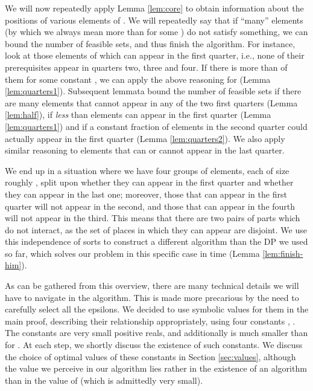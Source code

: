 \documentclass{article}
\theoremstyle{definition}
\begin{document}
We will now repeatedly apply Lemma \ref{lem:core} to obtain information about the
positions of various elements of . We will repeatedly say that if ``many'' elements
(by which we always mean more than  for some ) do not satisfy something,
we can bound the number of feasible sets, and thus finish the algorithm.
For instance, look at those elements of  which
can appear in the first quarter, i.e., none of their prerequisites appear in quarters
two, three and four. If there is more than  of them for some constant , we can apply the above
reasoning for  (Lemma \ref{lem:quarters1}).
Subsequent lemmata bound the number of feasible sets if there are many
elements that cannot appear in any of the two first quarters (Lemma \ref{lem:half}),
if {\em less} than  elements can appear in the first
quarter (Lemma \ref{lem:quarters1}) and if a constant fraction of elements
in the second quarter could actually appear in the first quarter
(Lemma \ref{lem:quarters2}). We also apply similar reasoning to elements that
can or cannot appear in the last quarter.

We end up in a situation where we have four groups of elements, each of size
roughly , split upon whether they can appear in the first quarter
and whether they can appear in the last one; moreover, those that can appear in
the first quarter will not appear in the second, and those that can appear in
the fourth will not appear in the third. This means that there are two pairs of parts
which do not interact, as the set of places in which they can appear are
disjoint. We use this independence of sorts to construct a different algorithm
than the DP we used so far, which solves our problem in this specific case
in time  (Lemma \ref{lem:finish-him}).

As can be gathered from this overview, there are many technical details we
will have to navigate in the algorithm. This is made more precarious by
the need to carefully select all the epsilons. We decided to use symbolic values for
them in the main proof, describing their relationship appropriately, using four constants
, . The constants  are very small positive reals, and additionally 
is much smaller than  for . At each step, we shortly discuss the existence
of such constants. We discuss the choice of optimal values of these constants in Section \ref{sec:values},
although the value we perceive in our algorithm lies rather in the existence
of an  algorithm than in the value of  (which is admittedly very small).
\end{document}
